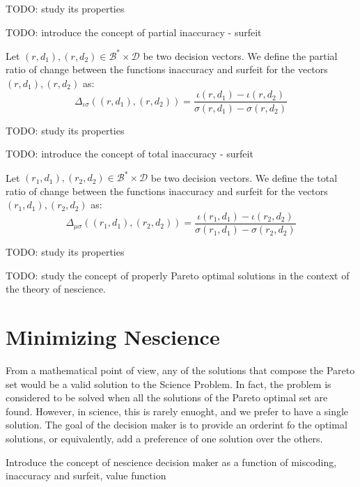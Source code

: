 {\color{red} TODO: study its properties}

{\color{red} TODO: introduce the concept of partial inaccuracy - surfeit}

\begin{definition}
Let $(r, d_1), (r, d_2) \in \mathcal{B}^\ast \times \mathcal{D}$ be two decision vectors. We define the partial ratio of change between the functions inaccuracy and surfeit for the vectors $(r, d_1), (r, d_2)$ as:
\[
\Delta_{\iota \sigma} \left( (r, d_1), (r, d_2) \right) = \frac{ \iota(r, d_1) - \iota(r, d_2) }{ \sigma(r, d_1) - \sigma(r, d_2) }
\] 
\end{definition}

{\color{red} TODO: study its properties}

{\color{red} TODO: introduce the concept of total inaccuracy - surfeit}

\begin{definition}
Let $(r_1, d_1), (r_2, d_2) \in \mathcal{B}^\ast \times \mathcal{D}$ be two decision vectors. We define the total ratio of change between the functions inaccuracy and surfeit for the vectors $(r_1, d_1), (r_2, d_2)$ as:
\[
\Delta_{\mu \sigma} \left( (r_1, d_1), (r_2, d_2) \right) = \frac{ \iota(r_1, d_1) - \iota(r_2, d_2) }{ \sigma(r_1, d_1) - \sigma(r_2, d_2) }
\] 
\end{definition}

{\color{red} TODO: study its properties}

{\color{red} TODO: study the concept of properly Pareto optimal solutions in the context of the theory of nescience.}

%
%

\section{Minimizing Nescience}

From a mathematical point of view, any of the solutions that compose the Pareto set would be a valid solution to the Science Problem. In fact, the problem is considered to be solved when all the solutions of the Pareto optimal set are found. However, in science, this is rarely enuoght, and we prefer to have a single solution. The goal of the decision maker is to provide an orderint fo the optimal solutions, or equivalently, add a preference of one solution over the others.

{\color{red} Introduce the concept of nescience decision maker as a function of miscoding, inaccuracy and surfeit, value function}

